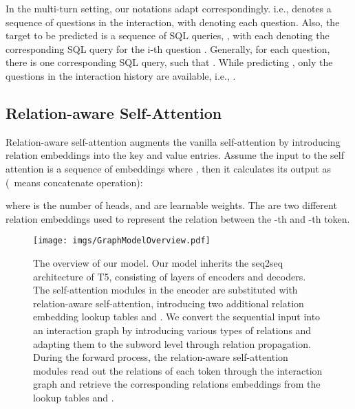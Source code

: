 \documentclass[11pt]{article}
\begin{document}
In the multi-turn setting, our notations adapt correspondingly. i.e.,  denotes a sequence of questions in the interaction, with  denoting each question. Also, the target to be predicted is a sequence of SQL queries, , with each  denoting the corresponding SQL query for the i-th question . Generally, for each question, there is one corresponding SQL query, such that . While predicting , only the questions in the interaction history are available, i.e., . 

\subsection{Relation-aware Self-Attention}
Relation-aware self-attention \citep{shaw-etal-2018-self} augments the vanilla self-attention \citep{NIPS2017_3f5ee243} by introducing relation embeddings into the key and value entries. Assume the input to the self attention is a sequence of  embeddings  where , then it calculates its output  as (\  means concatenate operation):



where   is the number of heads, and  are learnable weights. The  are two different relation embeddings used to represent the relation  between the -th and -th token.  

\begin{figure*}[t]
    \centering
    \texttt{[image: imgs/GraphModelOverview.pdf]}
    \caption{The overview of our model. Our model inherits the seq2seq architecture of T5, consisting of  layers of encoders and decoders. The self-attention modules in the encoder are substituted with relation-aware self-attention, introducing two additional relation embedding lookup tables  and . We convert the sequential input into an interaction graph by introducing various types of relations and adapting them to the subword level through relation propagation. During the forward process, the relation-aware self-attention modules read out the relations of each token through the interaction graph and retrieve the corresponding relations embeddings from the lookup tables  and . }
    \label{fig:model}
\end{figure*}
\end{document}
